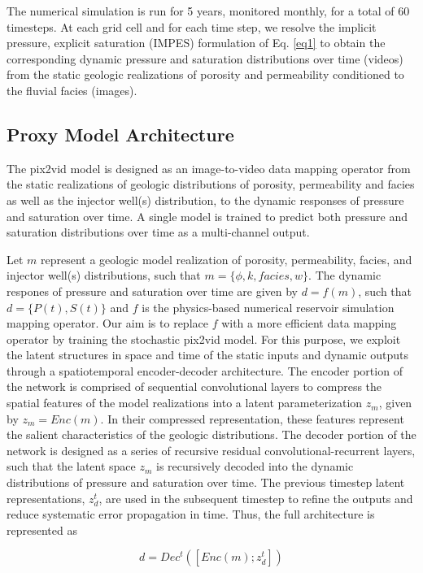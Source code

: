 \documentclass[default,iicol]{sn-jnl}
\begin{document}
The numerical simulation is run for 5 years, monitored monthly, for a total of 60 timesteps. At each grid cell and for each time step, we resolve the implicit pressure, explicit saturation (IMPES) formulation of Eq. \eqref{eq1} to obtain the corresponding dynamic pressure and saturation distributions over time (videos) from the static geologic realizations of porosity and permeability conditioned to the fluvial facies (images).

\subsection{Proxy Model Architecture}\label{subsec2_model_architecture}
The pix2vid model is designed as an image-to-video data mapping operator from the static realizations of geologic distributions of porosity, permeability and facies as well as the injector well(s) distribution, to the dynamic responses of pressure and saturation over time. A single model is trained to predict both pressure and saturation distributions over time as a multi-channel output.  

Let $m$ represent a geologic model realization of porosity, permeability, facies, and injector well(s) distributions, such that $m = \{\phi,k,facies,w\}$. The dynamic respones of pressure and saturation over time are given by $d=f(m)$, such that $d=\{P(t), S(t)\}$ and $f$ is the physics-based numerical reservoir simulation mapping operator. Our aim is to replace $f$ with a more efficient data mapping operator by training the stochastic pix2vid model. For this purpose, we exploit the latent structures in space and time of the static inputs and dynamic outputs through a spatiotemporal encoder-decoder architecture. The encoder portion of the network is comprised of sequential convolutional layers to compress the spatial features of the model realizations into a latent parameterization $z_m$, given by $z_m=Enc(m)$. In their compressed representation, these features represent the salient characteristics of the geologic distributions. The decoder portion of the network is designed as a series of recursive residual convolutional-recurrent layers, such that the latent space $z_m$ is recursively decoded into the dynamic distributions of pressure and saturation over time. The previous timestep latent representations, $z_d^t$, are used in the subsequent timestep to refine the outputs and reduce systematic error propagation in time. Thus, the full architecture is represented as

\begin{equation} \label{eq6}
    d = Dec^t ( [ Enc(m) ; z_d^t ] )
\end{equation}
\end{document}
